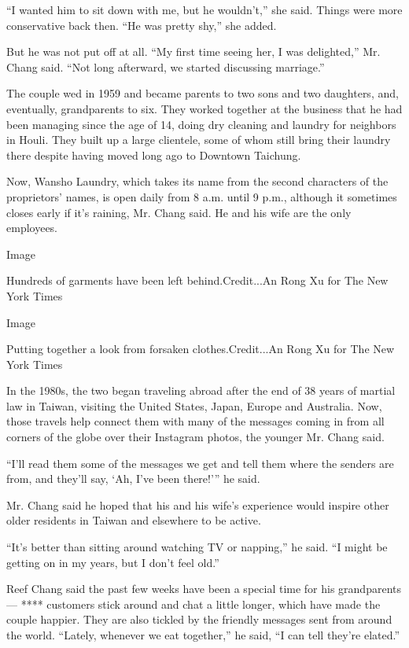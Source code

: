 ``I wanted him to sit down with me, but he wouldn't,'' she said. Things
were more conservative back then. ``He was pretty shy,'' she added.

But he was not put off at all. ``My first time seeing her, I was
delighted,'' Mr. Chang said. ``Not long afterward, we started discussing
marriage.''

The couple wed in 1959 and became parents to two sons and two daughters,
and, eventually, grandparents to six. They worked together at the
business that he had been managing since the age of 14, doing dry
cleaning and laundry for neighbors in Houli. They built up a large
clientele, some of whom still bring their laundry there despite having
moved long ago to Downtown Taichung.

Now, Wansho Laundry, which takes its name from the second characters of
the proprietors' names, is open daily from 8 a.m. until 9 p.m., although
it sometimes closes early if it's raining, Mr. Chang said. He and his
wife are the only employees.

Image

Hundreds of garments have been left behind.Credit...An Rong Xu for The
New York Times

Image

Putting together a look from forsaken clothes.Credit...An Rong Xu for
The New York Times

In the 1980s, the two began traveling abroad after the end of 38 years
of martial law in Taiwan, visiting the United States, Japan, Europe and
Australia. Now, those travels help connect them with many of the
messages coming in from all corners of the globe over their Instagram
photos, the younger Mr. Chang said.

``I'll read them some of the messages we get and tell them where the
senders are from, and they'll say, `Ah, I've been there!''' he said.

Mr. Chang said he hoped that his and his wife's experience would inspire
other older residents in Taiwan and elsewhere to be active.

``It's better than sitting around watching TV or napping,'' he said. ``I
might be getting on in my years, but I don't feel old.''

Reef Chang said the past few weeks have been a special time for his
grandparents --- **** customers stick around and chat a little longer,
which have made the couple happier. They are also tickled by the
friendly messages sent from around the world. ``Lately, whenever we eat
together,'' he said, ``I can tell they're elated.''

